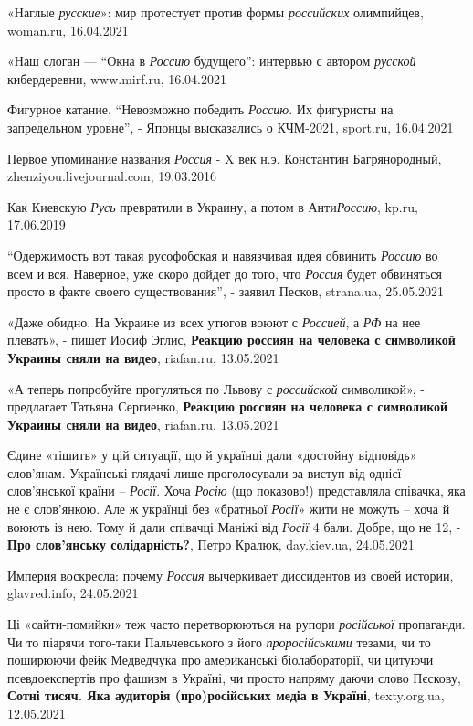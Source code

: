 «Наглые \emph{русские}»: мир протестует против формы \emph{российских}
олимпийцев, woman.ru, 16.04.2021

«Наш слоган — \enquote{Окна в \emph{Россию} будущего}: интервью с автором \emph{русской}
кибердеревни, www.mirf.ru, 16.04.2021

Фигурное катание. \enquote{Невозможно победить \emph{Россию}. Их фигуристы на
запредельном уровне}, - Японцы высказались о КЧМ-2021, sport.ru, 16.04.2021

Первое упоминание названия \emph{Россия} - X век н.э. Константин
Багрянородный, zhenziyou.livejournal.com, 19.03.2016

Как Киевскую \emph{Русь} превратили в Украину, а потом в Анти\emph{Россию},
kp.ru, 17.06.2019

\enquote{Одержимость вот такая русофобская и навязчивая идея обвинить \emph{Россию} во всем и
вся. Наверное, уже скоро дойдет до того, что \emph{Россия} будет обвиняться просто в
факте своего существования}, - заявил Песков, strana.ua, 25.05.2021

«Даже обидно. На Украине из всех утюгов воюют с \emph{Россией}, а \emph{РФ} на нее плевать», - пишет Иосиф Эглис,
\textbf{Реакцию россиян на человека с символикой Украины сняли на видео}, riafan.ru, 13.05.2021

«А теперь попробуйте прогуляться по Львову с \emph{российской} символикой», - предлагает Татьяна Сергиенко,
\textbf{Реакцию россиян на человека с символикой Украины сняли на видео}, riafan.ru, 13.05.2021

Єдине «тішить» у цій ситуації, що й українці дали «достойну відповідь»
слов'янам. Українські глядачі лише проголосували за виступ від однієї
слов'янської країни – \emph{Росії}. Хоча \emph{Росію} (що показово!) представляла співачка,
яка не є слов'янкою. Але ж українці без «братньої \emph{Росії}» жити не можуть
– хоча й воюють із нею. Тому й дали співачці Маніжі від \emph{Росії} 4 бали.
Добре, що не 12, - \textbf{Про слов'янську солідарність?}, Петро Кралюк, day.kiev.ua,
24.05.2021

Империя воскресла: почему \emph{Россия} вычеркивает диссидентов из своей
истории, glavred.info, 24.05.2021

Ці «сайти-помийки» теж часто перетворюються на рупори \emph{російської}
пропаганди. Чи то піарячи того-таки Пальчевського з його \emph{проросійськими}
тезами, чи то поширюючи фейк Медведчука про американські біолабораторії, чи
цитуючи псевдоекспертів про фашизм в Україні, чи просто напряму даючи слово
Пєскову, \textbf{Сотні тисяч. Яка аудиторія (про)російських медіа в Україні},
texty.org.ua, 12.05.2021

